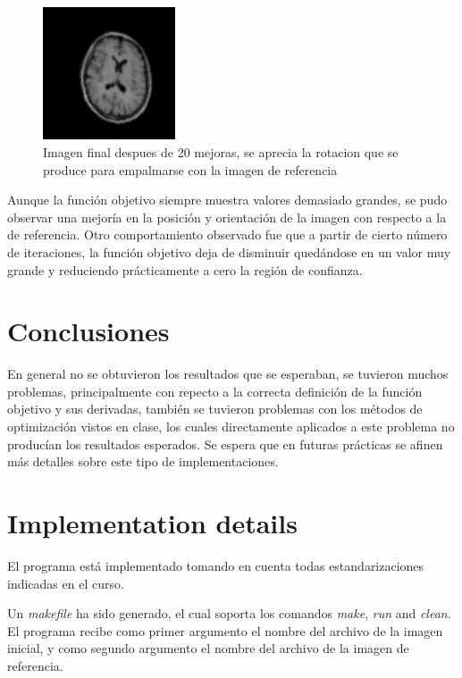 \documentclass[10pt,journal,compsoc]{styles/IEEEtran}
\begin{document}
\begin{figure}[hbtp]
\centering
\includegraphics[width=0.35\textwidth]{mriCfinal.png}
\caption{Imagen final despues de 20 mejoras, se aprecia la rotacion que se produce para empalmarse con la imagen de referencia}
\end{figure}

Aunque la funci\'on objetivo siempre muestra valores demasiado grandes, se pudo observar una mejor\'ia en la posici\'on y orientaci\'on de la imagen con respecto a la de referencia. Otro comportamiento observado fue que a partir de cierto n\'umero de iteraciones, la funci\'on objetivo deja de disminuir qued\'andose en un valor muy grande y reduciendo pr\'acticamente a cero la regi\'on de confianza.


\section{Conclusiones}

En general no se obtuvieron los resultados que se esperaban, se tuvieron muchos problemas, principalmente con repecto a la correcta definici\'on de la funci\'on objetivo y sus derivadas, tambi\'en se tuvieron problemas con los m\'etodos de optimizaci\'on vistos en clase, los cuales directamente aplicados a este problema no produc\'ian los resultados esperados. Se espera que en futuras pr\'acticas se afinen m\'as detalles sobre este tipo de implementaciones.





\appendix
\section{Implementation details}
El programa est\'a implementado tomando en cuenta todas estandarizaciones indicadas en el curso.

Un \textit{makefile} ha sido generado, el cual soporta los comandos \textit{make}, \textit{run} and \textit{clean}. El programa recibe como primer argumento el nombre del archivo de la imagen inicial, y como segundo argumento el nombre del archivo de la imagen de referencia.
\end{document}
